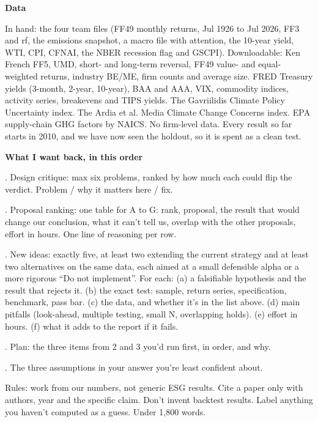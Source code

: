 \medskip
\par\textbf{Data}
\par\noindent In hand: the four team files (FF49 monthly returns, Jul 1926 to Jul 2026, FF3 and rf, the emissions snapshot, a macro file with attention, the 10-year yield, WTI, CPI, CFNAI, the NBER recession flag and GSCPI). Downloadable: Ken French FF5, UMD, short- and long-term reversal, FF49 value- and equal-weighted returns, industry BE/ME, firm counts and average size. FRED Treasury yields (3-month, 2-year, 10-year), BAA and AAA, VIX, commodity indices, activity series, breakevens and TIPS yields. The Gavriilidis Climate Policy Uncertainty index. The Ardia et al. Media Climate Change Concerns index. EPA supply-chain GHG factors by NAICS. No firm-level data. Every result so far starts in 2010, and we have now seen the holdout, so it is spent as a clean test.
\medskip
\par\textbf{What I want back, in this order}
\par{}. Design critique: max six problems, ranked by how much each could flip the verdict. Problem / why it matters here / fix.
\par{}. Proposal ranking: one table for A to G: rank, proposal, the result that would change our conclusion, what it can't tell us, overlap with the other proposals, effort in hours. One line of reasoning per row.
\par{}. New ideas: exactly five, at least two extending the current strategy and at least two alternatives on the same data, each aimed at a small defensible alpha or a more rigorous ``Do not implement''. For each: (a) a falsifiable hypothesis and the result that rejects it. (b) the exact test: sample, return series, specification, benchmark, pass bar. (c) the data, and whether it's in the list above. (d) main pitfalls (look-ahead, multiple testing, small N, overlapping holds). (e) effort in hours. (f) what it adds to the report if it fails.
\par{}. Plan: the three items from 2 and 3 you'd run first, in order, and why.
\par{}. The three assumptions in your answer you're least confident about.
\medskip
\par\noindent Rules: work from our numbers, not generic ESG results. Cite a paper only with authors, year and the specific claim. Don't invent backtest results. Label anything you haven't computed as a guess. Under 1,800 words.
